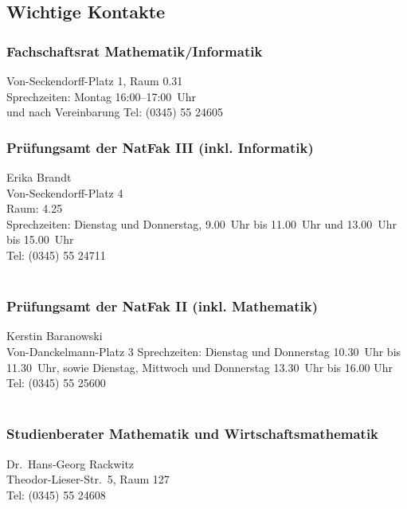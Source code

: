 \subsection{Wichtige Kontakte}

\subsubsection{Fachschaftsrat Mathematik/Informatik}
Von-Seckendorff-Platz 1, Raum 0.31\\
Sprechzeiten: Montag 16:00--17:00~Uhr\\ und nach Vereinbarung
Tel: (0345) 55 24605\\

\subsubsection{Prüfungsamt der NatFak III (inkl. Informatik)}
Erika Brandt\\
Von-Seckendorff-Platz 4\\
Raum: 4.25\\
Sprechzeiten: Dienstag und Donnerstag, 9.00~Uhr bis 11.00~Uhr und
13.00~Uhr bis 15.00~Uhr\\
Tel: (0345) 55 24711\\
\\

\subsubsection{Prüfungsamt der NatFak II (inkl. Mathematik)}
Kerstin Baranowski\\
Von-Danckelmann-Platz 3
Sprechzeiten: Dienstag und Donnerstag 10.30~Uhr bis 11.30~Uhr, sowie
Dienstag, Mittwoch und Donnerstag 13.30~Uhr bis 16.00 Uhr\\
Tel: (0345) 55 25600\\
\\

\subsubsection{Studienberater Mathematik und Wirtschaftsmathematik}
Dr.\ Hans-Georg Rackwitz\\
Theodor-Lieser-Str.\ 5, Raum 127\\
Tel: (0345) 55 24608\\
\\

